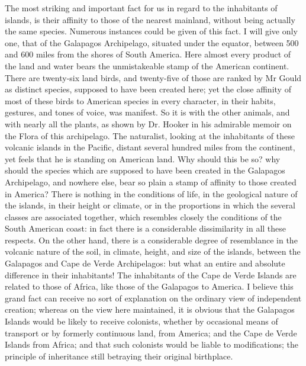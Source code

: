\indent The most striking and important fact for us in regard to the inhabitants of islands, is their affinity to those of the nearest mainland, without being actually the same species. Numerous instances could be given of this fact. I will give only one, that of the Galapagos Archipelago, situated under the equator, between 500 and 600 miles from the shores of South America. Here almost every product of the land and water bears the unmistakeable stamp of the American continent. There are twenty-six land birds, and twenty-five of those are ranked by Mr Gould as distinct species, supposed to have been created here; yet the close affinity of most of these birds to American species in every character, in their habits, gestures, and tones of voice, was manifest. So it is with the other animals, and with nearly all the plants, as shown by Dr. Hooker in his admirable memoir on the Flora of this archipelago. The naturalist, looking at the inhabitants of these volcanic islands in the Pacific, distant several hundred miles from the continent, yet feels that he is standing on American land. Why should this be so?  why should the species which are supposed to have been created in the Galapagos Archipelago, and nowhere else, bear so plain a stamp of affinity to those created in America?  There is nothing in the conditions of life, in the geological nature of the islands, in their height or climate, or in the proportions in which the several classes are associated together, which resembles closely the conditions of the South American coast: in fact there is a considerable dissimilarity in all these respects. On the other hand, there is a considerable degree of resemblance in the volcanic nature of the soil, in climate, height, and size of the islands, between the Galapagos and Cape de Verde Archipelagos: but what an entire and absolute difference in their inhabitants! The inhabitants of the Cape de Verde Islands are related to those of Africa, like those of the Galapagos to America. I believe this grand fact can receive no sort of explanation on the ordinary view of independent creation; whereas on the view here maintained, it is obvious that the Galapagos Islands would be likely to receive colonists, whether by occasional means of transport or by formerly continuous land, from America; and the Cape de Verde Islands from Africa; and that such colonists would be liable to modifications; the principle of inheritance still betraying their original birthplace.~\\
